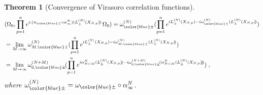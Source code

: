\documentclass[a4paper, 11pt]{article}
\DeclareMathOperator{\1}{\mathds{1}}
\newtheorem{thm}{Theorem} [section]
\begin{document}
\begin{thm}[Convergence of Virasoro correlation functions]
\begin{align*}
& (\Omega_{0},\prod_{p=1}^{n}e^{i:(\pi_{{\color{blue}\pm}}\circ\alpha^{N}_{\infty})(L^{(N)}_{\pm}(X_{N,p})\!):}\Omega_{0}) = \omega^{(N)}_{{\color{blue}\pm}}(\prod_{p=1}^{n}e^{iL^{(N)}_{\pm}(X_{N,p})-i\omega^{(N)}_{{\color{blue}\pm}}(L^{(N)}_{\pm}(X_{N,p})\!)}) \\
& = \lim_{M\rightarrow\infty}\omega^{(N)}_{M,{\color{blue}\pm}}(\prod_{p=1}^{n}e^{iL^{(N)}_{\pm}(X_{N,p})-i\omega^{(N)}_{M,{\color{blue}\pm}}(L^{(N)}_{\pm}(X_{N,p})\!)}) \\
& = \lim_{M\rightarrow\infty}\omega^{(N+M)}_{0,{\color{blue}\pm}}\!(\prod_{p=1}^{n}e^{i\alpha^{N}_{N+M}(L^{(N)}_{\pm}(X_{N,p})\!)-i\omega^{(N+M)}_{0,{\color{blue}\pm}}\!(\alpha^{N}_{N+M}(L^{(N)}_{\pm}(X_{N,p})\!)\!)}) \;,
\end{align*}
where $\omega^{(N)}_{{\color{blue}\pm}} = \omega_{{\color{blue}\pm}}\circ\alpha^{N}_{\infty}$.
\end{thm}
\end{document}
